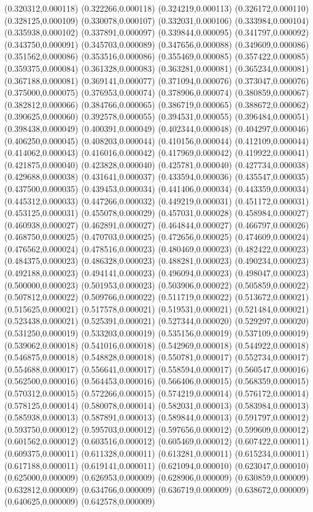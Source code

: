 {(0.320312,0.000118) (0.322266,0.000118) (0.324219,0.000113) (0.326172,0.000110) (0.328125,0.000109) (0.330078,0.000107) (0.332031,0.000106) (0.333984,0.000104) (0.335938,0.000102) (0.337891,0.000097) (0.339844,0.000095) (0.341797,0.000092) (0.343750,0.000091) (0.345703,0.000089) (0.347656,0.000088) (0.349609,0.000086) (0.351562,0.000086) (0.353516,0.000086) (0.355469,0.000085) (0.357422,0.000085) (0.359375,0.000084) (0.361328,0.000083) (0.363281,0.000081) (0.365234,0.000081) (0.367188,0.000081) (0.369141,0.000077) (0.371094,0.000076) (0.373047,0.000076) (0.375000,0.000075) (0.376953,0.000074) (0.378906,0.000074) (0.380859,0.000067) (0.382812,0.000066) (0.384766,0.000065) (0.386719,0.000065) (0.388672,0.000062) (0.390625,0.000060) (0.392578,0.000055) (0.394531,0.000055) (0.396484,0.000051) (0.398438,0.000049) (0.400391,0.000049) (0.402344,0.000048) (0.404297,0.000046) (0.406250,0.000045) (0.408203,0.000044) (0.410156,0.000044) (0.412109,0.000044) (0.414062,0.000043) (0.416016,0.000042) (0.417969,0.000042) (0.419922,0.000041) (0.421875,0.000040) (0.423828,0.000040) (0.425781,0.000040) (0.427734,0.000038) (0.429688,0.000038) (0.431641,0.000037) (0.433594,0.000036) (0.435547,0.000035) (0.437500,0.000035) (0.439453,0.000034) (0.441406,0.000034) (0.443359,0.000034) (0.445312,0.000033) (0.447266,0.000032) (0.449219,0.000031) (0.451172,0.000031) (0.453125,0.000031) (0.455078,0.000029) (0.457031,0.000028) (0.458984,0.000027) (0.460938,0.000027) (0.462891,0.000027) (0.464844,0.000027) (0.466797,0.000026) (0.468750,0.000025) (0.470703,0.000025) (0.472656,0.000025) (0.474609,0.000024) (0.476562,0.000024) (0.478516,0.000023) (0.480469,0.000023) (0.482422,0.000023) (0.484375,0.000023) (0.486328,0.000023) (0.488281,0.000023) (0.490234,0.000023) (0.492188,0.000023) (0.494141,0.000023) (0.496094,0.000023) (0.498047,0.000023) (0.500000,0.000023) (0.501953,0.000023) (0.503906,0.000022) (0.505859,0.000022) (0.507812,0.000022) (0.509766,0.000022) (0.511719,0.000022) (0.513672,0.000021) (0.515625,0.000021) (0.517578,0.000021) (0.519531,0.000021) (0.521484,0.000021) (0.523438,0.000021) (0.525391,0.000021) (0.527344,0.000020) (0.529297,0.000020) (0.531250,0.000019) (0.533203,0.000019) (0.535156,0.000019) (0.537109,0.000019) (0.539062,0.000018) (0.541016,0.000018) (0.542969,0.000018) (0.544922,0.000018) (0.546875,0.000018) (0.548828,0.000018) (0.550781,0.000017) (0.552734,0.000017) (0.554688,0.000017) (0.556641,0.000017) (0.558594,0.000017) (0.560547,0.000016) (0.562500,0.000016) (0.564453,0.000016) (0.566406,0.000015) (0.568359,0.000015) (0.570312,0.000015) (0.572266,0.000015) (0.574219,0.000014) (0.576172,0.000014) (0.578125,0.000014) (0.580078,0.000014) (0.582031,0.000013) (0.583984,0.000013) (0.585938,0.000013) (0.587891,0.000013) (0.589844,0.000013) (0.591797,0.000012) (0.593750,0.000012) (0.595703,0.000012) (0.597656,0.000012) (0.599609,0.000012) (0.601562,0.000012) (0.603516,0.000012) (0.605469,0.000012) (0.607422,0.000011) (0.609375,0.000011) (0.611328,0.000011) (0.613281,0.000011) (0.615234,0.000011) (0.617188,0.000011) (0.619141,0.000011) (0.621094,0.000010) (0.623047,0.000010) (0.625000,0.000009) (0.626953,0.000009) (0.628906,0.000009) (0.630859,0.000009) (0.632812,0.000009) (0.634766,0.000009) (0.636719,0.000009) (0.638672,0.000009) (0.640625,0.000009) (0.642578,0.000009) }
